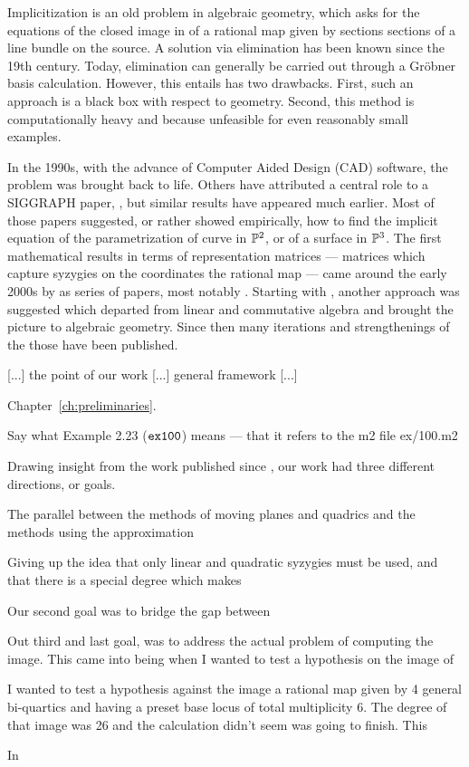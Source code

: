 \documentclass[fleqn,reqno]{amsart}
\begin{document}



Implicitization is an old problem in algebraic geometry,
which asks for the equations of the closed image in of a rational map
given by sections sections of a line bundle on the source.
A solution via elimination has been known since the 19th century.
Today, elimination can generally be carried out through a Gr\"obner basis calculation.
However, this entails has two drawbacks.
First, such an approach is a black box with respect to geometry.
Second, this method is computationally heavy and because unfeasible for even reasonably
small examples.

In the 1990s, with the advance of Computer Aided Design (CAD) software,
the problem was brought back to life.
Others have attributed a central role to a SIGGRAPH paper, \citet{SC-95},
but similar results have appeared much earlier.
Most of those papers suggested, or rather showed empirically, how to find the implicit equation 
of the parametrization of curve in $\mathbb{P}^2$, or of a surface in $\mathbb{P}^3$.
The first mathematical results in terms of representation matrices ---
matrices which capture syzygies on the coordinates the rational map ---
came around the early 2000s by as series of papers, most notably \citet{CGZ-00}.
Starting with \citet{BJ-03}, another approach was suggested which departed from
linear and commutative algebra and brought the picture to algebraic geometry.
Since then many iterations and strengthenings of the those have been published.

[...] the point of our work [...] general framework [...]

Chapter~\ref{ch:preliminaries}.

Say what Example 2.23 ($\mathop{\tt ex100}$) means --- that it refers to the m2 file ex/100.m2

\newpage
Drawing insight from the work published since \citet{CGZ-00},
our work had three different directions, or goals.

The parallel between the methods of moving planes and quadrics and the methods using
the approximation

Giving up the idea that only linear and quadratic syzygies must be used, and that there is
a special degree which makes

Our second goal was to bridge the gap between 

Out third and last goal, was to address the actual problem of computing the image.
This came into being when I wanted to test a hypothesis on the image of

I wanted to test a hypothesis against the image a rational map
given by 4 general bi-quartics and having a preset base locus of total multiplicity $6$.
The degree of that image was 26 and the calculation didn't seem was going to finish.
This 

In



\end{document}
